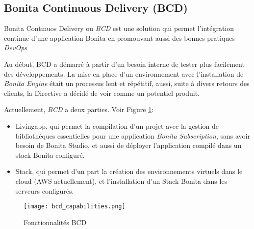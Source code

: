 \subsection{Bonita Continuous Delivery (BCD)} \label{bcd}
Bonita Continuos Delivery ou \textit{BCD} est une solution qui permet l'intégration continue d'une application Bonita en promouvant aussi des bonnes pratiques \emph{DevOps}

Au début, BCD a démarré à partir d'un besoin interne de tester plus facilement des développements. La mise en place d'un environnement avec l'installation de \textit{Bonita Engine} était un processus lent et répétitif, aussi, suite à divers retours des clients, la Directive a décidé de voir comme un potentiel produit.

Actuellement, \textit{BCD} a deux parties. Voir Figure \ref{fig:bcd_cap}:
\begin{itemize}
  \item Livingapp, qui permet la compilation d'un projet avec la gestion de bibliothèques essentielles pour une application \textit{Bonita Subscription}, sans avoir besoin de Bonita Studio, et aussi de déployer l'application compilé dans un stack Bonita configuré.
  \item Stack, qui permet d'un part la création des environnements virtuels dans le cloud (AWS actuellement), et l’installation d'un Stack Bonita dans les serveurs configurés.
\end{itemize}

\begin{figure}[!ht]
\centering
\texttt{[image: bcd\_capabilities.png]}
\caption{Fonctionnalités BCD}
\label{fig:bcd_cap}
\end{figure}
